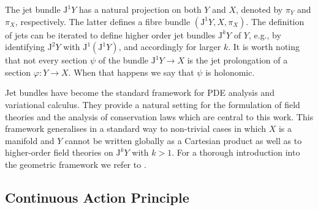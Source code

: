 \documentclass[12pt,a4paper,reqno]{article}
\begin{document}
The jet bundle ${\ensuremath{\mathrm{J}}}^{1} Y$ has a natural projection on both $Y$ and $X$, denoted by $\pi_{Y}$ and $\pi_{X}$, respectively. The latter defines a fibre bundle $({\ensuremath{\mathrm{J}}}^{1} Y, X, \pi_{X})$. The definition of jets can be iterated to define higher order jet bundles ${\ensuremath{\mathrm{J}}}^{k} Y$ of $Y$, e.g., by identifying ${\ensuremath{\mathrm{J}}}^{2} Y$ with ${\ensuremath{\mathrm{J}}}^{1} ( {\ensuremath{\mathrm{J}}}^{1} Y )$, and accordingly for larger $k$.
It is worth noting that not every section $\psi$ of the bundle ${\ensuremath{\mathrm{J}}}^{1} Y \rightarrow X$ is the jet prolongation of a section ${\ensuremath{\varphi}} : Y \rightarrow X$. When that happens we say that $\psi$ is holonomic.

Jet bundles have become the standard framework for PDE analysis and variational calculus.
They provide a natural setting for the formulation of field theories and the analysis of conservation laws which are central to this work.
This framework generalises in a standard way to non-trivial cases in which $X$ is a manifold and $Y$ cannot be written globally as a Cartesian product as well as to higher-order field theories on ${\ensuremath{\mathrm{J}}}^{k} Y$ with $k > 1$.
For a thorough introduction into the geometric framework we refer to \citet{GotayMarsden:1998}.

\subsection{Continuous Action Principle}
\label{sec:vi_continuous_action_principle}
\end{document}
